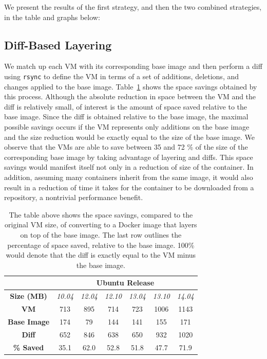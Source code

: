 \documentclass[\myfontsize, letterpaper]{article}
\begin{document}
We present the results of the first strategy, and then the two combined strategies, in the table and graphs below:

\subsection{Diff-Based Layering}
We match up each VM with its corresponding base image and then perform a diff using \texttt{rsync} to define the VM in terms of a set of additions, deletions, and changes applied to the base image. Table~\ref{table:diff} shows the space savings obtained by this process. Although the absolute reduction in space between the VM and the diff is relatively small, of interest is the amount of space saved relative to the base image. Since the diff is obtained relative to the base image, the maximal possible savings occurs if the VM represents only additions on the base image and the size reduction would be exactly equal to the size of the base image. We observe that the VMs are able to save between 35 and 72 \% of the size of the corresponding base image by taking advantage of layering and diffs. This space savings would manifest itself not only in a reduction of size of the container. In addition, assuming many containers inherit from the same image, it would also result in a reduction of time it takes for the container to be downloaded from a repository, a nontrivial performance benefit.

\begin{table}[h]
\centering
    \begin{tabular}{| c | c | c | c | c | c | c |}
    \hline
& \multicolumn{6}{|c|}{\bfseries Ubuntu Release} \\ \hline
    \bfseries Size (MB) & \itshape 10.04 & \itshape 12.04 & \itshape 12.10 & \itshape 13.04 & \itshape 13.10 & \itshape 14.04 \\ \hline
    \bfseries VM & 713 &  895 & 714 & 723 & 1006 & 1143\\ \hline
    \bfseries Base Image & 174 & 79 & 144 & 141 & 155 & 171  \\ \hline
    \bfseries Diff & 652 & 846 & 638 & 650 & 932 & 1020\\ \hline \hline
    \bfseries \% Saved & 35.1 & 62.0 & 52.8 & 51.8 & 47.7 & 71.9\\
    \hline
    \end{tabular}
\caption{The table above shows the space savings, compared to the original VM size, of converting to a Docker image that layers on top of the base image. The last row outlines the percentage of space saved, relative to the base image. 100\% would denote that the diff is exactly equal to the VM minus the base image.}
\label{table:diff}
\end{table}
\end{document}
